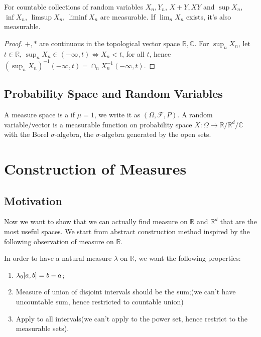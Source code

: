 \begin{thm}[Measurability]
    For countable collections of random variables \(X_{n}, Y_{n}\), \(X +Y, XY\) and \(\sup X_{n}\), \( \inf X_{n}\), \( \limsup X_{n}\), \( \liminf X_{n}\) are measurable. If \(\lim_{n} X_{n}\) exists, it's also measurable.
\end{thm}

\begin{proof}
    \(+, *\) are continuous in the topological vector space \(\mathbb{R}, \mathbb{C}\). 
    For \(\sup_{n} X_{n}\), let \(t \in \mathbb{R}\), \(\sup_{n} X_{n} \in (-\infty, t) \iff X_{n} < t\), for all \(t\), hence \((\sup_{n} X_{n})^{-1}(-\infty, t) = \cap_{n} X_{n} ^{-1} (- \infty, t)\).    
\end{proof}

\subsection{Probability Space and Random Variables}

A measure space is a  if \(\mu =1\), we write it as \((\Omega, \mathcal{F}, P)\). A random variable/vector is a measurable function on probability space \(X: \Omega \to \mathbb{R}/\mathbb{R}^{d}/\mathbb{C}\) with the Borel \(\sigma\)-algebra, the \(\sigma\)-algebra generated by the open sets.

\section{Construction of Measures}

\subsection{Motivation}

Now we want to show that we can actually find measure on \(\mathbb{R}\) and \(\mathbb{R}^{d}\) that are the most useful spaces. We start from abstract construction method inspired by the following observation of measure on \(\mathbb{R}\).

In order to have a natural measure \(\lambda\) on \(\mathbb{R}\), we want the following properties:
\begin{enumerate}
    \item \(\lambda_{0} \linterval{a}{b} = b - a \);
    \item Measure of union of disjoint intervals should be the sum;(we can't have uncountable sum, hence restricted to countable union)
    \item Apply to all intervals(we can't apply to the power set, hence restrict to the measurable sets).
\end{enumerate}

